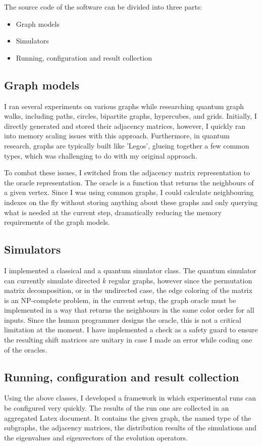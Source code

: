 The source code of the software can be divided into three parts:

\begin{itemize}
    \item Graph models
    \item Simulators
    \item Running, configuration and result collection
\end{itemize}


\subsection{Graph models}

I ran several experiments on various graphs while researching quantum graph walks, including paths, circles, bipartite graphs, hypercubes, and grids. Initially, I directly generated and stored their adjacency matrices, however, I quickly ran into memory scaling issues with this approach. Furthermore, in quantum research, graphs are typically built like 'Legos', glueing together a few common types, which was challenging to do with my original approach.

To combat these issues, I switched from the adjacency matrix representation to the oracle representation. The oracle is a function that returns the neighbours of a given vertex. Since I was using common graphs, I could calculate neighbouring indexes on the fly without storing anything about these graphs and only querying what is needed at the current step, dramatically reducing the memory requirements of the graph models.

\subsection{Simulators}

I implemented a classical and a quantum simulator class. The quantum simulator can currently simulate directed $k$ regular graphs, however since the permutation matrix decomposition, or in the undirected case, the edge coloring of the matrix is an NP-complete problem, in the current setup, the graph oracle must be implemented in a way that returns the neighbours in the same color order for all inputs. Since the human programmer designs the oracle, this is not a critical limitation at the moment. I have implemented a check as a safety guard to ensure the resulting shift matrices are unitary in case I made an error while coding one of the oracles.

\subsection{Running, configuration and result collection}

Using the above classes, I developed a framework in which experimental runs can be configured very quickly. The results of the run one are collected in an aggregated Latex document. It contains the given graph, the named type of the subgraphs, the adjacency matrices, the distribution results of the simulations and the eigenvalues and eigenvectors of the evolution operators. 

